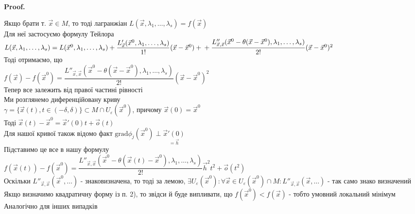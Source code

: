 \documentclass[a4paper, 10pt]{article}
\makeatletter
\def\qed{$\blacksquare$}
\theoremstyle{theoremdd}
\theoremstyle{theoremdd}
\theoremstyle{theoremdd}
\theoremstyle{theoremdd}
\theoremstyle{theoremdd}
\theoremstyle{theoremdd}
\theoremstyle{theoremdd}
\theoremstyle{theoremdd}
\theoremstyle{theoremdd}
\renewenvironment{proof}[1][Proof.\\]{\par
\pushQED{\hfill \qed}%
\normalfont \topsep6\p@\@plus6\p@\relax
\trivlist
\item\relax
{\bfseries
#1\@addpunct{.}}\hspace\labelsep\ignorespaces
}{%
\popQED\endtrivlist\@endpefalse
}
\makeatother
\begin{document}
\begin{proof}
Якщо брати т. $\vec{x} \in M$, то тоді лагранжіан $L(\vec{x}, \lambda_1, \dots, \lambda_s) = f(\vec{x})$\\
Для неї застосуємо формулу Тейлора\\
$L(\vec{x}, \lambda_1, \dots, \lambda_s) = L(\vec{x}^0, \lambda_1,\dots,\lambda_s) + \dfrac{L'_{\vec{x}}(\vec{x}^0,\lambda_1,\dots,\lambda_s)}{1!}(\vec{x}-\vec{x}^0) + \\ + \dfrac{L''_{\vec{x},\vec{x}}(\vec{x}^0 - \theta(\vec{x}-\vec{x}^0), \lambda_1,\dots,\lambda_s)}{2!}(\vec{x}-\vec{x}^0)^2$\\
Тоді отримаємо, що\\
$f(\vec{x})-f(\vec{x}^0) = \dfrac{L''_{\vec{x},\vec{x}}(\vec{x}^0 - \theta(\vec{x}-\vec{x}^0), \lambda_1,\dots,\lambda_s)}{2!}(\vec{x}-\vec{x}^0)^2$\\
Тепер все залежить від правої частині рівності\\
Ми розглянемо диференційовану криву \\ $\gamma = \{\vec{x}(t), t \in (-\delta,\delta) \} \subset M \cap U_{\varepsilon}(\vec{x}^0)$, причому $\vec{x}(0)=\vec{x}^0$\\
Тоді $\vec{x}(t) - \vec{x}^0 = \vec{x}'(0)t + \vec{o}(t)$\\
Для нашої кривої також відомо факт $\textrm{grad} \phi_j (\vec{x}^0) \perp \underset{=\vec{h}}{\vec{x}'(0)}$\\
Підставимо це все в нашу формулу\\
$f(\vec{x}(t)) -f(\vec{x}^0) = \dfrac{L''_{\vec{x},\vec{x}}(\vec{x}^0 - \theta(\vec{x}(t)-\vec{x}^0), \lambda_1,\dots,\lambda_s)}{2!}\vec{h}^2 t^2 + \vec{o}(t^2)$\\
Оскільки $L''_{\vec{x},\vec{x}}(\vec{x}^0,\dots)$ - знаковизначена, то тоді за лемою, $\exists U_{\varepsilon}(\vec{x}^0): \forall \vec{x} \in U_{\varepsilon}(\vec{x}^0) \cap M: L''_{\vec{x},\vec{x}}(\vec{x},\dots)$ - так само знако визначений\\
Якщо визначимо квадратичну форму із п. 2), то звідси й буде випливати, що $f(\vec{x}^0) < f(\vec{x})$ - тобто умовний локальний мінімум\\
Аналогічно для інших випадків
\end{proof}
\end{document}
